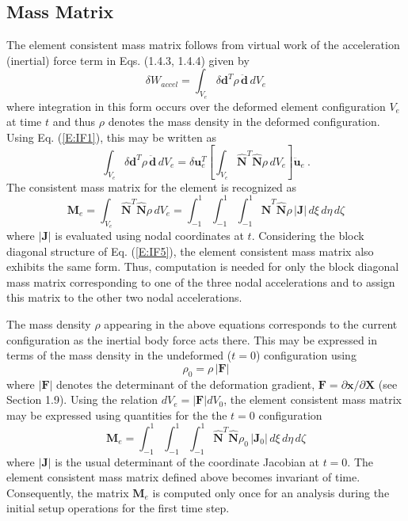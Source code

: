 \documentclass[11pt]{report}
\numberwithin{equation}{section}
\newcommand{\bmf } {\boldsymbol }  %
\newcommand{\nid}{\noindent}
\begin{document}
\subsection{Mass Matrix}
\nid The element consistent mass matrix follows from virtual work of the acceleration 
(inertial) force term in Eqs. (1.4.3, 1.4.4) given by
%
\begin{equation}\label{E:Ma}
\delta W_{accel}=\int_{V_e} \delta \bmf{d}^T \rho\, \ddot{\bmf{d}}\, d V_e
\end{equation}
%
\nid where integration in this form occurs over the deformed element
configuration $V_e$ at time $t$ and thus $\rho$ denotes the mass
density in the deformed configuration. Using Eq. (\ref{E:IF1}), this may be 
written as
%
\begin{equation}\label{E:Mb}
\int_{V_e} \delta \bmf{d}^T \rho\, \ddot{\bmf{d}}\, d V_e =
\delta \bmf{u}_e^T \left [ \int_{V_e}  \hat{\bmf{N}}^T \hat{\bmf{N}} 
\rho\, d V_e \right ] \ddot{\bmf{u}}_e\ .
\end{equation}
%
\nid The consistent mass matrix for the element is recognized as
%
\begin{equation}\label{E:Mc}
\mathbf{M}_e =  \int_{V_e}  \hat{\bmf{N}}^T \hat{\bmf{N}} 
\rho\, d V_e = \int_{-1}^1 \int_{-1}^1 \int_{-1}^1\hat{\bmf{N}}^T \hat{\bmf{N}} 
\rho\, |\mathbf{J}|\, d \xi\, d\eta\, d\zeta
\end{equation}
%
where $ |\mathbf{J}|$ is evaluated using nodal coordinates at $t$.
Considering the block diagonal structure of Eq. (\ref{E:IF5}), the element consistent 
mass matrix also exhibits the same form. Thus,
computation is needed for only 
the block diagonal mass matrix corresponding to one of the 
three nodal accelerations and to assign 
this matrix to the other two nodal accelerations.

The mass density $\rho$ appearing in the above equations corresponds to the 
current configuration as the inertial body force acts there. 
This may be expressed in terms of the mass density in the undeformed ($t=0$) 
configuration using
%
\begin{equation}\label{E:Md}
\rho_0 = \rho\, | \mathbf{F}|
\end{equation}
%
where $|\mathbf{F}|$ denotes the determinant of the deformation gradient,
$\mathbf{F} = \partial \bmf{x} / \partial  \bmf{X}$ (see Section 1.9). 
Using the relation $dV_e =|\mathbf{F}| d V_0$,
 the element consistent mass matrix may be expressed using quantities for the the $t=0$
 configuration
%
\begin{equation}\label{E:Me}
\mathbf{M}_e =   \int_{-1}^1 \int_{-1}^1 \int_{-1}^1\hat{\bmf{N}}^T \hat{\bmf{N}} 
\rho_0\, |\mathbf{J}_0|\, d \xi\, d\eta\, d\zeta
\end{equation}
%
where $|\mathbf{J}|$ is the usual determinant of the coordinate Jacobian at $t=0$. 
The element consistent mass matrix defined above becomes invariant of time.
Consequently, the matrix $\mathbf{M}_e$ is computed only once for an analysis during the initial setup 
operations for the first time step.
\end{document}

